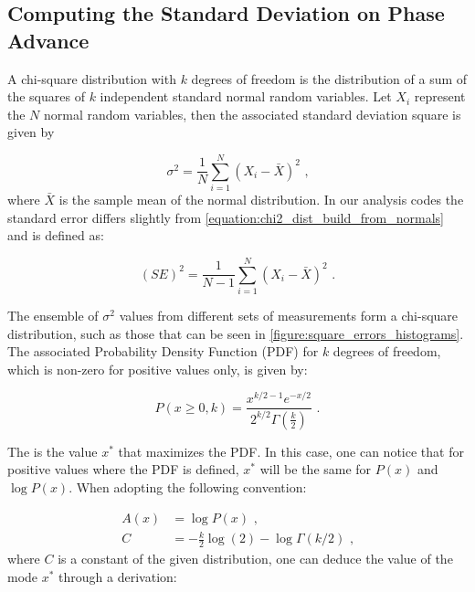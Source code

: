 \subsection*{Computing the Standard Deviation on Phase Advance}

A chi-square distribution with \(k\) degrees of freedom  is the distribution of a sum of the squares of \(k\) independent standard normal random variables.
Let \(X_{i}\) represent the \(N\) normal random variables, then the associated standard deviation square is given by

\begin{equation}
    \sigma^{2} = \frac{1}{N} \sum_{i=1}^{N} \left( X_{i} - \bar{X} \right)^{2} \text{ ,}
    \label{equation:chi2_dist_build_from_normals}
\end{equation}
where \(\bar{X}\) is the sample mean of the normal distribution.
In our analysis codes the standard error differs slightly from \cref{equation:chi2_dist_build_from_normals} and is defined as:

\begin{equation}
    (SE)^{2} = \frac{1}{N-1} \sum_{i=1}^{N} \left( X_{i} - \bar{X} \right)^{2} \text{ .}
    \label{equation:omc3_standard_error}
\end{equation}

The ensemble of \(\sigma^{2}\) values from different sets of measurements form a chi-square distribution, such as those that can be seen in \cref{figure:square_errors_histograms}. 
The associated Probability Density Function (PDF) for \(k\) degrees of freedom, which is non-zero for positive values only, is given by:

\begin{equation}
    P(x \geq 0, k) = \frac{x^{k/2-1} e^{-x/2}} {2^{k/2} \Gamma(\frac{k}{2})} \text{ .}
    \label{equation:chi2_pdf_equation}
\end{equation}

The  is the value \(x^{*}\) that maximizes the PDF.
In this case, one can notice that for positive values where the PDF is defined, \(x^{*}\) will be the same for \(P(x)\) and \(\log P(x)\).
When adopting the following convention:

\begin{equation}
    \begin{aligned}
        A(x) &= \log P(x)  \text{ ,} \\
        C    &= - \frac{k}{2} \log(2) - \log \Gamma(k/2)  \text{ ,}
    \end{aligned}
    \label{equation:chi2_pdf_derivation_convention}
\end{equation}
where \(C\) is a constant of the given distribution, one can deduce the value of the mode \(x^{*}\) through a derivation:

